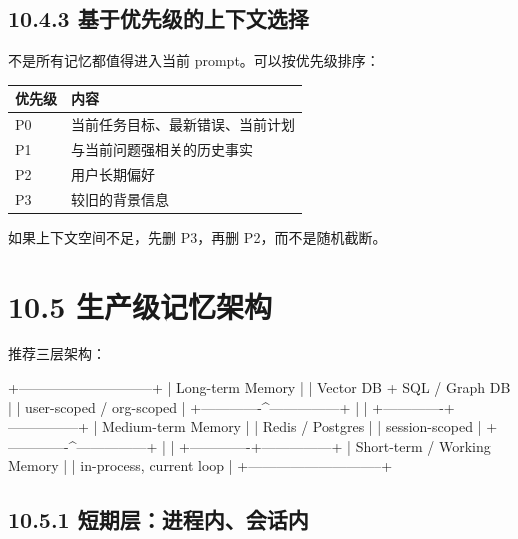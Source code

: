 \subsection{10.4.3 基于优先级的上下文选择}

不是所有记忆都值得进入当前 prompt。可以按优先级排序：


\begingroup
\scriptsize
\setlength{\tabcolsep}{3pt}
\begin{longtable}{|p{}|p{}|}
\hline
优先级 & 内容 \\ \hline
P0 & 当前任务目标、最新错误、当前计划 \\ \hline
P1 & 与当前问题强相关的历史事实 \\ \hline
P2 & 用户长期偏好 \\ \hline
P3 & 较旧的背景信息 \\ \hline
\end{longtable}
\endgroup

如果上下文空间不足，先删 P3，再删 P2，而不是随机截断。


\section{10.5 生产级记忆架构}

推荐三层架构：


\begin{codeblock}
                    +-----------------------------+
                    |      Long-term Memory       |
                    | Vector DB + SQL / Graph DB  |
                    | user-scoped / org-scoped    |
                    +-------------^---------------+
                                  |
                                  |
                    +-------------+---------------+
                    |      Medium-term Memory     |
                    | Redis / Postgres            |
                    | session-scoped              |
                    +-------------^---------------+
                                  |
                                  |
                    +-------------+---------------+
                    | Short-term / Working Memory |
                    | in-process, current loop    |
                    +-----------------------------+
\end{codeblock}

\subsection{10.5.1 短期层：进程内、会话内}

